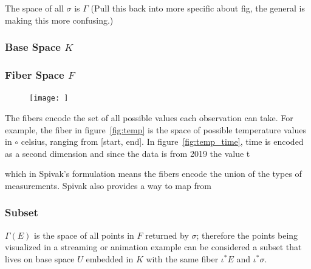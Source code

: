\documentclass[../main.tex]{subfiles}
\begin{document}
The space of all $\sigma$ is $\Gamma$  (Pull this back into more specific about fig, the general is making this more confusing.)

\subsubsection{Base Space $K$}





\subsubsection{Fiber Space $F$}
\begin{figure}
    \texttt{[image: ]}
    \label{fig:movie}
\end{figure}
The fibers encode the set of all possible values each observation can take. For example, the fiber in figure~\ref{fig:temp} is the space of possible temperature values in $\circ$ celsius, ranging from [start, end]. In figure~\ref{fig:temp_time}, time is encoded as a second dimension and since the data is from 2019 the value t


which in Spivak's formulation means the fibers encode the union of the types of measurements\cite{spivakSIMPLICIALDATABASES}. Spivak also provides a way to map from 


\subsubsection{Subset}
$\Gamma(E)$ is the space of all points in $F$ returned by $\sigma$; therefore the points being visualized in a streaming or animation example can be considered a subset that lives on base space $U$ embedded in $K$ with the same fiber $\iota^*E$ and $\iota^*\sigma$.   

\end{document}
